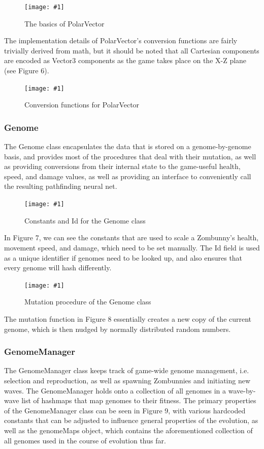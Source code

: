 \documentclass[letterpaper]{article}
\def\imfig#1#2{\begin{figure}[h] \centering \texttt{[image: \#1]} \caption{#2} \end{figure}}
\def\imfigB#1#2{\begin{figure} \centering \texttt{[image: \#1]} \caption{#2} \end{figure}}
\begin{document}
\imfigB{PolarVector1}{The basics of PolarVector}

The implementation details of PolarVector's conversion functions are fairly trivially derived from math, but it should be noted that all Cartesian components are encoded as Vector3 components as the game takes place on the X-Z plane (see Figure 6).

\imfigB{PolarVector2}{Conversion functions for PolarVector}

\subsubsection{Genome}
The Genome class encapsulates the data that is stored on a genome-by-genome basis, and provides most of the procedures that deal with their mutation, as well as providing conversions from their internal state to the game-useful health, speed, and damage values, as well as providing an interface to conveniently call the resulting pathfinding neural net.

\imfigB{Genome1}{Constants and Id for the Genome class}

In Figure 7, we can see the constants that are used to scale a Zombunny's health, movement speed, and damage, which need to be set manually. The Id field is used as a unique identifier if genomes need to be looked up, and also ensures that every genome will hash differently.

\imfig{Mutation}{Mutation procedure of the Genome class}

The mutation function in Figure 8 essentially creates a new copy of the current genome, which is then nudged by normally distributed random numbers.

\subsubsection{GenomeManager}

The GenomeManager class keeps track of game-wide genome management, i.e. selection and reproduction, as well as spawning Zombunnies and initiating new waves. The GenomeManager holds onto a collection of all genomes in a wave-by-wave list of hashmaps that map genomes to their fitness. The primary properties of the GenomeManager class can be seen in Figure 9, with various hardcoded constants that can be adjusted to influence general properties of the evolution, as well as the genomeMaps object, which contains the aforementioned collection of all genomes used in the course of evolution thus far.
\end{document}
